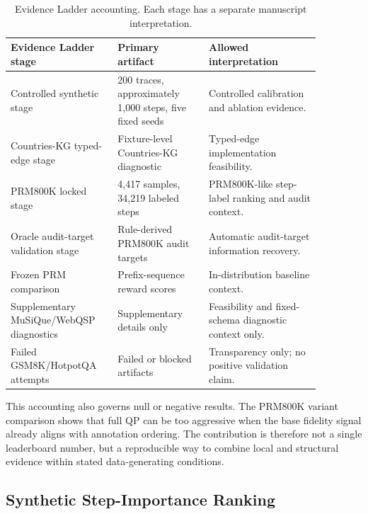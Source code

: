 \documentclass[a4paper,fleqn]{cas-sc}
\begin{document}
\begin{table}[ht]
\caption{Evidence Ladder accounting. Each stage has a separate manuscript interpretation.}
\label{tab:evidence-routes}
\centering
\small
\renewcommand{\arraystretch}{1.12}
\begin{tabular}{p{0.29\linewidth}p{0.26\linewidth}p{0.32\linewidth}}
\toprule
\textbf{Evidence Ladder stage} & \textbf{Primary artifact} & \textbf{Allowed interpretation} \\
\midrule
Controlled synthetic stage & 200 traces, approximately 1,000 steps, five fixed seeds & Controlled calibration and ablation evidence. \\
Countries-KG typed-edge stage & Fixture-level Countries-KG diagnostic & Typed-edge implementation feasibility. \\
PRM800K locked stage & 4,417 samples, 34,219 labeled steps & PRM800K-like step-label ranking and audit context. \\
Oracle audit-target validation stage & Rule-derived PRM800K audit targets & Automatic audit-target information recovery. \\
Frozen PRM comparison & Prefix-sequence reward scores & In-distribution baseline context. \\
Supplementary MuSiQue/WebQSP diagnostics & Supplementary details only & Feasibility and fixed-schema diagnostic context only. \\
Failed GSM8K/HotpotQA attempts & Failed or blocked artifacts & Transparency only; no positive validation claim. \\
\bottomrule
\end{tabular}
\end{table}

This accounting also governs null or negative results. The PRM800K variant comparison shows that full QP can be too aggressive when the base fidelity signal already aligns with annotation ordering. The contribution is therefore not a single leaderboard number, but a reproducible way to combine local and structural evidence within stated data-generating conditions.

\subsection{Synthetic Step-Importance Ranking}
\label{sec:synthetic-ranking}
\end{document}
